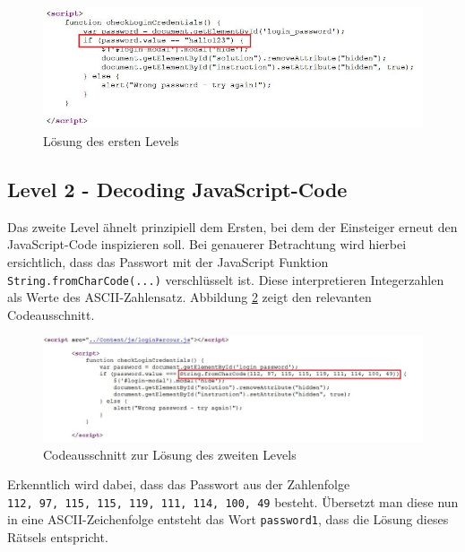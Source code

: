 \begin{figure}[H]
	\centering
	\includegraphics[width=\textwidth]{images/LoginParcours/login_level1_solution.jpg}
	\caption{Lösung des ersten Levels}
	\label{fig:login-parcours-level1-solution}
\end{figure}

\subsection{Level 2 - Decoding JavaScript-Code}
Das zweite Level ähnelt prinzipiell dem Ersten, bei dem der Einsteiger erneut den JavaScript-Code inspizieren soll. Bei genauerer Betrachtung wird hierbei ersichtlich, dass das Passwort mit der JavaScript Funktion \colorbox{altgray}{\lstinline|String.fromCharCode(...)|} verschlüsselt ist. Diese interpretieren Integerzahlen als Werte des ASCII-Zahlensatz. Abbildung \ref{fig:login-parcours-level2-solution} zeigt den relevanten Codeausschnitt. 

\begin{figure}[H]
	\centering
	\includegraphics[width=\textwidth]{images/LoginParcours/login_level2_solution.jpg}
	\caption{Codeausschnitt zur Lösung des zweiten Levels}
	\label{fig:login-parcours-level2-solution}
\end{figure}

Erkenntlich wird dabei, dass das Passwort aus der Zahlenfolge\\ \colorbox{altgray}{\lstinline|112, 97, 115, 115, 119, 111, 114, 100, 49|} besteht. Übersetzt man diese nun in eine ASCII-Zeichenfolge entsteht das Wort \colorbox{altgray}{\lstinline|password1|}, dass die Lösung dieses Rätsels entspricht.

